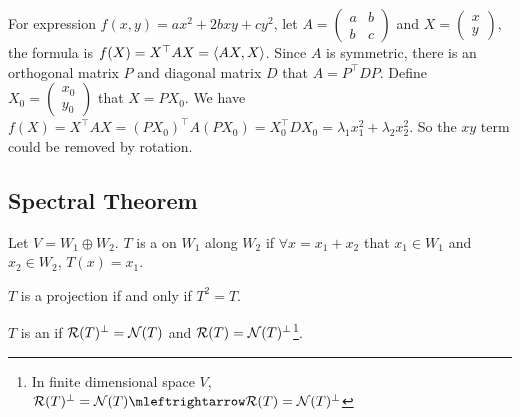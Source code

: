 \begin{theorem}
    For expression $f(x,y) = a x^2 + 2b xy + c y^2$, let $A = \begin{pmatrix}
        a & b \\
        b & c
    \end{pmatrix}$ and $X = \begin{pmatrix}
        x \\
        y
    \end{pmatrix}$, the formula is $f(X) = X^\top A X = \innerproduct{AX}{X}$. Since $A$ is symmetric, there is an orthogonal matrix $P$ and diagonal matrix $D$ that $A = P^\top D P$. Define $X_0 = \begin{pmatrix}
        x_0 \\
        y_0
    \end{pmatrix}$ that $X = PX_0$. We have $f(X) = X^\top A X = (P X_0)^\top A (P X_0) = X_0^\top D X_0 = \lambda_1 x_1^2 + \lambda_2 x_2^2$. So the $xy$ term could be removed by rotation.
\end{theorem}







\subsection{Spectral Theorem}

\begin{definition}
    Let $V = W_1 \oplus W_2$. $T$ is a  on $W_1$ along $W_2$ if $\forall x = x_1 + x_2$ that $x_1 \in W_1$ and $x_2 \in W_2$, $T(x) = x_1$.
\end{definition}

\begin{theorem}
    $T$ is a projection if and only if $T^2 = T$.
\end{theorem}

\begin{definition}
    $T$ is an  if $\mathcal{R}(T)^\bot = \mathcal{N}(T)$ and $\mathcal{R}(T)= \mathcal{N}(T)^\bot$\footnote{In finite dimensional space $V$, $\rangespace{T}^\bot = \nullspace{T} \mleftrightarrow \rangespace{T}= \nullspace{T}^\bot$}. 
\end{definition}




